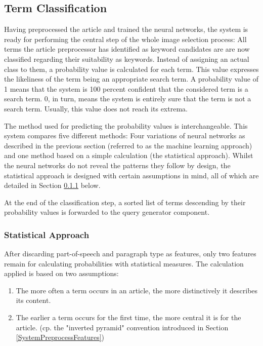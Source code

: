 \documentclass[11pt,a4paper,twoside]{article}
\begin{document}
\subsection{Term Classification} \label{SystemClassification}

Having preprocessed the article and trained the neural networks, the system is ready for performing the central step of the whole image selection process: All terms the article preprocessor has identified as keyword candidates are are now classified regarding their suitability as keywords. Instead of assigning an actual class to them, a probability value is calculated for each term. This value expresses the likeliness of the term being an appropriate search term. A probability value of 1 means that the system is 100 percent confident that the considered term is a search term. 0, in turn, means the system is entirely sure that the term is not a search term. Usually, this value does not reach its extrema.

The method used for predicting the probability values is interchangeable. This system compares five different methods: Four variations of neural networks as described in the previous section (referred to as the machine learning approach) and one method based on a simple calculation (the statistical approach). Whilst the neural networks do not reveal the patterns they follow by design, the statistical approach is designed with certain assumptions in mind, all of which are detailed in Section \ref{SystemClassificationStat} below. 

At the end of the classification step, a sorted list of terms descending by their probability values is forwarded to the query generator component.

\subsubsection{Statistical Approach} \label{SystemClassificationStat}

After discarding part-of-speech and paragraph type as features, only two features remain for calculating probabilities with statistical measures. The calculation applied is based on two assumptions:

\begin{enumerate}
    \item The more often a term occurs in an article, the more distinctively it describes its content.
    \item The earlier a term occurs for the first time, the more central it is for the article. (cp. the "inverted pyramid" convention introduced in Section \ref{SystemPreprocessFeatures})
\end{enumerate}
\end{document}
